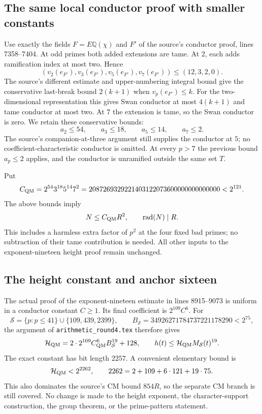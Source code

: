\subsection{The same local conductor proof with smaller constants}

Use exactly the fields $F=E\mathbb Q(\chi)$ and $F'$ of the source's
conductor proof, lines 7358--7404. At odd primes both added extensions
are tame. At $2$, each adds ramification index at most two. Hence
\[
 (v_2(e_{F'}),v_3(e_{F'}),v_5(e_{F'}),v_7(e_{F'}))
       \le(12,3,2,0).
\]
The source's different estimate and upper-numbering integral bound give
the conservative last-break bound $2(k+1)$ when $v_p(e_{F'})\le k$.
For the two-dimensional representation this gives Swan conductor at most
$4(k+1)$ and tame conductor at most two. At $7$ the extension is tame,
so the Swan conductor is zero. We retain these conservative bounds:
\[
 a_2\le54,\qquad a_3\le18,\qquad a_5\le14,\qquad a_7\le2.
\]
The source's companion-at-three argument still supplies the conductor
at $5$; no coefficient-characteristic conductor is omitted. At every
$p>7$ the previous bound $a_p\le2$ applies, and the conductor is
unramified outside the same set $T$.

Put
\[
 C_{\rm QM}=2^{54}3^{18}5^{14}7^2
  =2087269329221403122073600000000000000<2^{121}.
\]
The above bounds imply
\[
 N\le C_{\rm QM}R^2,\qquad \operatorname{rad}(N)\mid R.
\]
This includes a harmless extra factor of $p^2$ at the four fixed bad
primes; no subtraction of their tame contribution is needed. All other
inputs to the exponent-nineteen height proof remain unchanged.

\subsection{The height constant and anchor sixteen}

The actual proof of the exponent-nineteen estimate in lines 8915--9073
is uniform in a conductor constant $C\ge1$. Its final coefficient is
$2^{109}C^6$. For
\[
 \mathcal S=\{p:p\le41\}\cup\{109,439,2399\},\qquad
 B_{\mathcal S}=34926271784737221178290<2^{75},
\]
the argument of \texttt{arithmetic\_round4.tex} therefore gives
\[
 \mathcal H_{\rm QM}
 =2\cdot2^{109}C_{\rm QM}^6B_{\mathcal S}^{19}+128,
 \qquad h(t)\le\mathcal H_{\rm QM}M_{\mathcal S}(t)^{19}.
\]
The exact constant has bit length $2257$. A convenient elementary bound
is
\[
 \mathcal H_{\rm QM}<2^{2262},\qquad
 2262=2+109+6\cdot121+19\cdot75.
\]
This also dominates the source's CM bound $854R$, so the separate CM
branch is still covered. No change is made to the height exponent, the
character-support construction, the group theorem, or the prime-pattern
statement.


